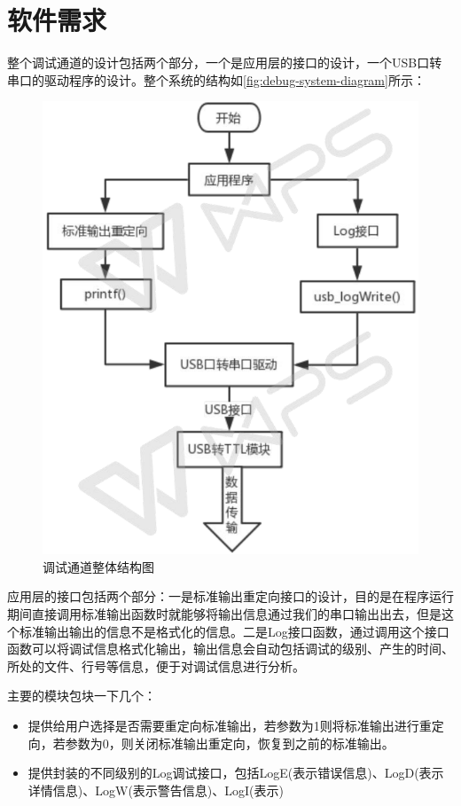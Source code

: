 \section{软件需求}

	整个调试通道的设计包括两个部分，一个是应用层的接口的设计，一个USB口转串口的驱动程序的设计。整个系统的结构如\autoref{fig:debug-system-diagram}所示：
\begin{figure}[!h]
\centering
\includegraphics[width=.7\textwidth]{./graphics/debug-system-diagram.pdf}
\caption{调试通道整体结构图}\label{fig:debug-system-diagram}
\end{figure}

应用层的接口包括两个部分：一是标准输出重定向接口的设计，目的是在程序运行期间直接调用标准输出函数时就能够将输出信息通过我们的串口输出出去，但是这个标准输出输出的信息不是格式化的信息。二是Log接口函数，通过调用这个接口函数可以将调试信息格式化输出，输出信息会自动包括调试的级别、产生的时间、所处的文件、行号等信息，便于对调试信息进行分析。

主要的模块包块一下几个：
\begin{itemize}
\item {} 提供给用户选择是否需要重定向标准输出，若参数为1则将标准输出进行重定向，若参数为0，则关闭标准输出重定向，恢复到之前的标准输出。

\item {} 提供封装的不同级别的Log调试接口，包括LogE(表示错误信息)、LogD(表示详情信息)、LogW(表示警告信息)、LogI(表示)
\end{itemize}

